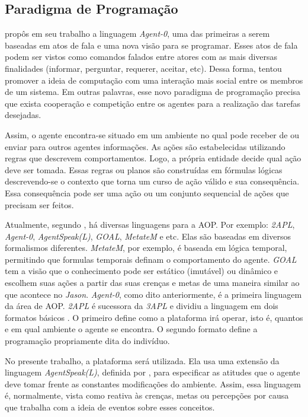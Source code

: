 \subsection{Paradigma de Programação} \label{sec:aoppp}

\citet{shoham1993agent} propôs em seu trabalho a linguagem \emph{Agent-0}, uma
das primeiras a serem baseadas em atos de fala e uma nova visão para se
programar.  Esses atos de fala podem ser vistos como comandos falados entre
atores com as mais diversas finalidades (informar, perguntar, requerer,
aceitar, etc).  Dessa forma,  tentou promover a
ideia de computação com uma interação mais social entre os membros de um sistema.
Em outras palavras, esse novo paradigma de programação precisa que exista
cooperação e competição entre os agentes para a realização das tarefas
desejadas.

Assim, o agente encontra-se situado em um ambiente no qual pode receber de ou
enviar para outros agentes informações. As ações são
estabelecidas utilizando regras que descrevem comportamentos. Logo, 
a própria entidade decide qual ação deve ser tomada. Essas regras ou
planos\label{plan}
são construídas em fórmulas lógicas descrevendo-se o contexto que torna um
curso de ação válido e sua consequência. Essa consequência pode ser uma ação
ou um conjunto sequencial de ações que precisam ser feitos.

Atualmente, segundo \citet{bordini2009multi}, há diversas linguagens para a
AOP. Por exemplo: \emph{2APL}, \emph{Agent-0}, \emph{AgentSpeak(L)},
\emph{GOAL}, \emph{MetateM} e etc. Elas são baseadas em diversos
formalismos diferentes. \emph{MetateM}, por exemplo, é baseada em lógica temporal,
permitindo que formulas temporais definam o comportamento do agente.
\emph{GOAL} tem a visão que o conhecimento pode ser estático (imutável) ou
dinâmico e escolhem suas ações a partir das suas crenças e metas de uma
maneira similar ao que acontece no \emph{Jason}.
\emph{Agent-0}, como dito anteriormente, é a primeira linguagem da
área de AOP. \emph{2APL} é sucessora da \emph{3APL} e dividiu a linguagem em
dois formatos básicos \cite{dastani20082apl}. O primeiro define como a
plataforma irá operar, isto é, quantos e em qual ambiente o agente se
encontra. O segundo formato define a programação propriamente dita do indivíduo.

No presente trabalho, a plataforma \jason \cite{bordini-jason} será utilizada.
Ela usa uma extensão da linguagem \emph{AgentSpeak(L)}, definida por
\citet{rao1996agentspeak}, para especificar as atitudes que o agente deve
tomar frente as constantes modificações do ambiente. Assim, essa linguagem é,
normalmente, vista como reativa às crenças, metas ou percepções por causa que
trabalha com a ideia de eventos sobre esses conceitos.

